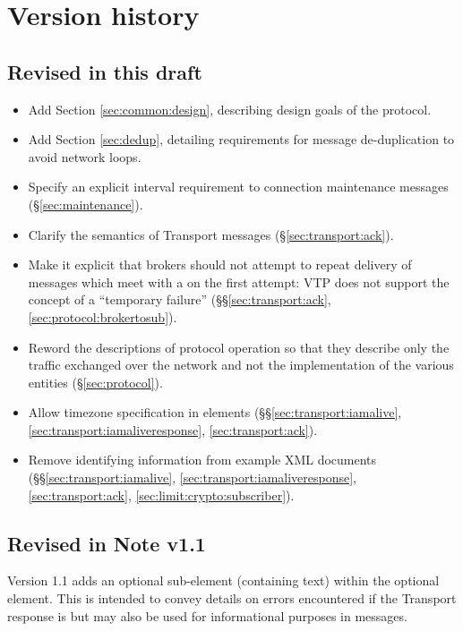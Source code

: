 \documentclass[a4paper,11pt]{ivoa}
\begin{document}
\section{Version history}

\subsection{Revised in this draft}

\begin{itemize}
    \item{Add Section \ref{sec:common:design}, describing design goals of the
    protocol.}

    \item{Add Section \ref{sec:dedup}, detailing requirements for message
    de-duplication to avoid network loops.}

    \item{Specify an explicit interval requirement to connection maintenance
    messages (\S\ref{sec:maintenance}).}

    \item{Clarify the semantics of  Transport messages
    (\S\ref{sec:transport:ack}).}

    \item{Make it explicit that brokers should not attempt to repeat delivery
    of messages which meet with a  on the first attempt: VTP does
    not support the concept of a ``temporary failure''
    (\S\S\ref{sec:transport:ack}, \ref{sec:protocol:brokertosub}).}

    \item{Reword the descriptions of protocol operation so that they describe
    only the traffic exchanged over the network and not the implementation of
    the various entities (\S\ref{sec:protocol}).}

    \item{Allow timezone specification in 
     elements (\S\S\ref{sec:transport:iamalive},
    \ref{sec:transport:iamaliveresponse}, \ref{sec:transport:ack}).}

    \item{Remove identifying information from example XML documents
    (\S\S\ref{sec:transport:iamalive}, \ref{sec:transport:iamaliveresponse},
    \ref{sec:transport:ack}, \ref{sec:limit:crypto:subscriber}).}
\end{itemize}

\subsection{Revised in Note v1.1}

Version 1.1 adds an optional  sub-element (containing text)
within the optional  element. This is intended to convey
details on errors encountered if the Transport response is  but
may also be used for informational purposes in  messages.


\end{document}
